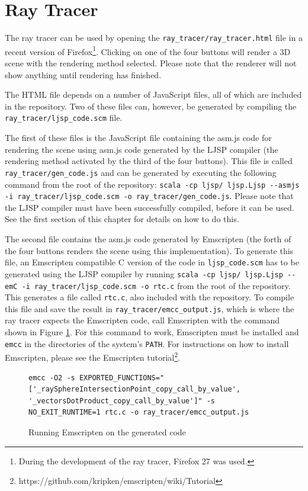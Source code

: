 \documentclass[11pt]{report}
\begin{document}
\section{Ray Tracer}

The ray tracer can be used by opening the \texttt{ray_tracer/ray_tracer.html} file in a recent version of Firefox\footnote{During the development of the ray tracer, Firefox 27 was used.}. Clicking on one of the four buttons will render a 3D scene with the rendering method selected. Please note that the renderer will not show anything until rendering has finished. 

The HTML file depends on a number of JavaScript files, all of which are included in the repository. Two of these files can, however, be generated by compiling the \texttt{ray_tracer/ljsp_code.scm} file.

The first of these files is the JavaScript file containing the asm.js code for rendering the scene using asm.js code generated by the LJSP compiler (the rendering method activated by the third of the four buttons). This file is called \texttt{ray_tracer/gen_code.js} and can be generated by executing the following command from the root of the repository: \texttt{scala -cp ljsp/ ljsp.Ljsp {-}-asmjs -i ray_tracer/ljsp_code.scm -o ray_tracer/gen_code.js}. Please note that the LJSP compiler must have been successfully compiled, before it can be used. See the first section of this chapter for details on how to do this.

The second file contains the asm.js code generated by Emscripten (the forth of the four buttons renders the scene using this implementation). To generate this file, an Emscripten compatible C version of the code in \texttt{ljsp_code.scm} has to be generated using the LJSP compiler by running \texttt{scala -cp ljsp/ ljsp.Ljsp {-}-emC -i ray_\-tra\-cer/ljsp_\-code.scm -o rtc.c} from the root of the repository. This generates a file called \texttt{rtc.c}, also included with the repository. To compile this file and save the result in \texttt{ray_tracer/emcc_output.js}, which is where the ray tracer expects the Emscripten code, call Emscripten with the command shown in Figure \ref{emcccompile}. For this command to work, Emscripten must be installed and \texttt{emcc} in the directories of the system's \texttt{PATH}. For instructions on how to install Emscripten, please see the Emscripten tutorial\footnote{https://github.com/kripken/emscripten/wiki/Tutorial}.

\begin{figure}[ht]
\begin{lstlisting}
emcc -O2 -s EXPORTED_FUNCTIONS="['_raySphereIntersectionPoint_copy_call_by_value', '_vectorsDotProduct_copy_call_by_value']" -s NO_EXIT_RUNTIME=1 rtc.c -o ray_tracer/emcc_output.js
\end{lstlisting}
\caption{Running Emscripten on the generated code}
\label{emcccompile}
\end{figure}
\end{document}
